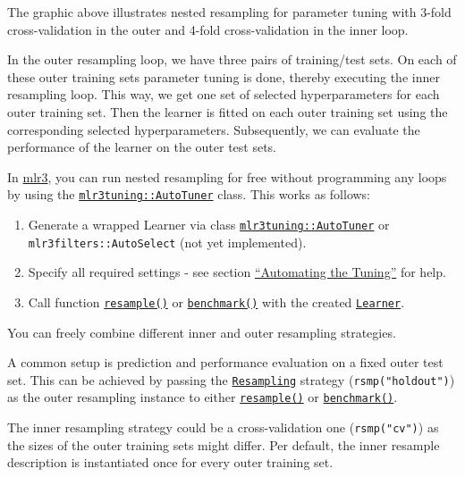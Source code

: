 \documentclass[]{article}
\providecommand{\tightlist}{%
  \setlength{\itemsep}{0pt}\setlength{\parskip}{0pt}}
\begin{document}
The graphic above illustrates nested resampling for parameter tuning with 3-fold cross-validation in the outer and 4-fold cross-validation in the inner loop.

In the outer resampling loop, we have three pairs of training/test sets.
On each of these outer training sets parameter tuning is done, thereby executing the inner resampling loop.
This way, we get one set of selected hyperparameters for each outer training set.
Then the learner is fitted on each outer training set using the corresponding selected hyperparameters.
Subsequently, we can evaluate the performance of the learner on the outer test sets.

In \href{https://mlr3.mlr-org.com}{mlr3}, you can run nested resampling for free without programming any loops by using the \href{https://mlr3tuning.mlr-org.com/reference/AutoTuner.html}{\texttt{mlr3tuning::AutoTuner}} class.
This works as follows:

\begin{enumerate}
\def\labelenumi{\arabic{enumi}.}
\tightlist
\item
  Generate a wrapped Learner via class \href{https://mlr3tuning.mlr-org.com/reference/AutoTuner.html}{\texttt{mlr3tuning::AutoTuner}} or \texttt{mlr3filters::AutoSelect} (not yet implemented).
\item
  Specify all required settings - see section \protect\hyperlink{autotuner}{``Automating the Tuning''} for help.
\item
  Call function \href{https://mlr3.mlr-org.com/reference/resample.html}{\texttt{resample()}} or \href{https://mlr3.mlr-org.com/reference/benchmark.html}{\texttt{benchmark()}} with the created \href{https://mlr3.mlr-org.com/reference/Learner.html}{\texttt{Learner}}.
\end{enumerate}

You can freely combine different inner and outer resampling strategies.

A common setup is prediction and performance evaluation on a fixed outer test set.
This can be achieved by passing the \href{https://mlr3.mlr-org.com/reference/Resampling.html}{\texttt{Resampling}} strategy (\texttt{rsmp("holdout")}) as the outer resampling instance to either \href{https://mlr3.mlr-org.com/reference/resample.html}{\texttt{resample()}} or \href{https://mlr3.mlr-org.com/reference/benchmark.html}{\texttt{benchmark()}}.

The inner resampling strategy could be a cross-validation one (\texttt{rsmp("cv")}) as the sizes of the outer training sets might differ.
Per default, the inner resample description is instantiated once for every outer training set.
\end{document}
